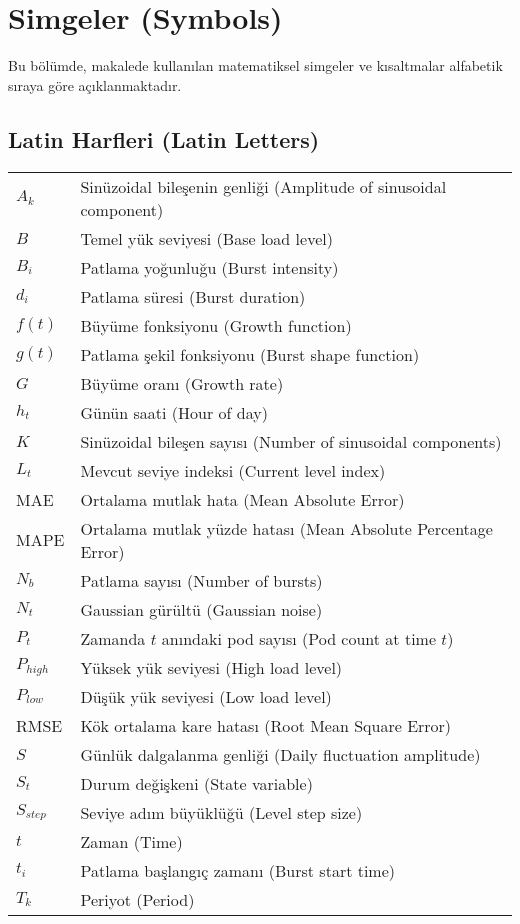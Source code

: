 \section{Simgeler (Symbols)}

Bu bölümde, makalede kullanılan matematiksel simgeler ve kısaltmalar alfabetik sıraya göre açıklanmaktadır.

\subsection{Latin Harfleri (Latin Letters)}

\begin{tabular}{ll}
$A_k$ & Sinüzoidal bileşenin genliği (Amplitude of sinusoidal component) \\
$B$ & Temel yük seviyesi (Base load level) \\
$B_i$ & Patlama yoğunluğu (Burst intensity) \\
$d_i$ & Patlama süresi (Burst duration) \\
$f(t)$ & Büyüme fonksiyonu (Growth function) \\
$g(t)$ & Patlama şekil fonksiyonu (Burst shape function) \\
$G$ & Büyüme oranı (Growth rate) \\
$h_t$ & Günün saati (Hour of day) \\
$K$ & Sinüzoidal bileşen sayısı (Number of sinusoidal components) \\
$L_t$ & Mevcut seviye indeksi (Current level index) \\
MAE & Ortalama mutlak hata (Mean Absolute Error) \\
MAPE & Ortalama mutlak yüzde hatası (Mean Absolute Percentage Error) \\
$N_b$ & Patlama sayısı (Number of bursts) \\
$N_t$ & Gaussian gürültü (Gaussian noise) \\
$P_t$ & Zamanda $t$ anındaki pod sayısı (Pod count at time $t$) \\
$P_{high}$ & Yüksek yük seviyesi (High load level) \\
$P_{low}$ & Düşük yük seviyesi (Low load level) \\
RMSE & Kök ortalama kare hatası (Root Mean Square Error) \\
$S$ & Günlük dalgalanma genliği (Daily fluctuation amplitude) \\
$S_t$ & Durum değişkeni (State variable) \\
$S_{step}$ & Seviye adım büyüklüğü (Level step size) \\
$t$ & Zaman (Time) \\
$t_i$ & Patlama başlangıç zamanı (Burst start time) \\
$T_k$ & Periyot (Period) \\
\end{tabular}

